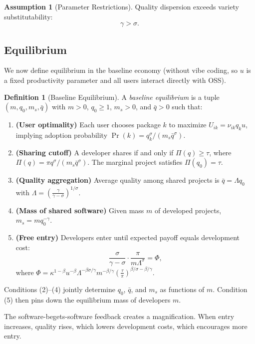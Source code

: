 \documentclass[11pt,a4paper]{article}
\theoremstyle{definition}
\newtheorem{definition}{Definition}
\newtheorem{assumption}{Assumption}
\theoremstyle{remark}
\begin{document}
\begin{assumption}[Parameter Restrictions]\label{ass:parameters}
Quality dispersion exceeds variety substitutability:
$$
\gamma > \sigma.
$$
\end{assumption}

\subsection{Equilibrium}\label{equilibrium}

We now define equilibrium in the baseline economy (without vibe coding,
so \(u\) is a fixed productivity parameter and all users interact
directly with OSS).

\begin{definition}[Baseline Equilibrium]\label{def:baseline-eq}
A \emph{baseline equilibrium} is a tuple $(m, q_0, m_s, \bar q)$ with $m > 0$, $q_0 \ge 1$, $m_s > 0$, and $\bar q > 0$ such that:
\begin{enumerate}
\item \textbf{(User optimality)} Each user chooses package $k$ to maximize $U_{ik} = \nu_{ik} q_k u$, implying adoption probability $\Pr(k) = q_k^\sigma / (m_s \bar q^\sigma)$.
\item \textbf{(Sharing cutoff)} A developer shares if and only if $\Pi(q) \ge \tau$, where $\Pi(q) = \pi q^\sigma / (m_s \bar q^\sigma)$. The marginal project satisfies $\Pi(q_0) = \tau$.
\item \textbf{(Quality aggregation)} Average quality among shared projects is $\bar q = \Lambda q_0$ with $\Lambda = \left(\frac{\gamma}{\gamma - \sigma}\right)^{1/\sigma}$.
\item \textbf{(Mass of shared software)} Given mass $m$ of developed projects, $m_s = m q_0^{-\gamma}$.
\item \textbf{(Free entry)} Developers enter until expected payoff equals development cost:
$$
\frac{\sigma}{\gamma - \sigma} \cdot \frac{\pi}{m \Lambda^\sigma} = \Phi,
$$
where $\Phi = \kappa^{1-\beta}u^{-\beta}\Lambda^{-\beta\sigma/\gamma}m^{-\beta/\gamma}\left(\frac\tau{\pi}\right)^{\beta/\sigma-\beta/\gamma}$.
\end{enumerate}
\end{definition}

Conditions (2)--(4) jointly determine \(q_0\), \(\bar q\), and \(m_s\)
as functions of \(m\). Condition (5) then pins down the equilibrium mass
of developers \(m\).

The software-begets-software feedback creates a magnification. When
entry increases, quality rises, which lowers development costs, which
encourages more entry.
\end{document}
